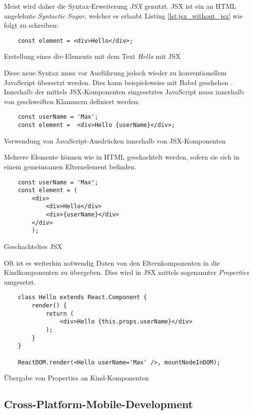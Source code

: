 Meist wird daher die Syntax-Erweiterung \textit{JSX} genutzt. JSX ist ein an HTML angelehnte \textit{Syntactic Sugar}, welcher es erlaubt Listing \ref{lst:jsx_without_jsx} wie folgt zu schreiben:
\begin{listing}[H]
    \begin{verbatim}
    const element = <div>Hello</div>;
    \end{verbatim}
    \caption{Erstellung eines div-Elements mit dem Text \textit{Hello} mit JSX}
    \label{lst:jsx_with_jsx}
\end{listing}
Diese neue Syntax muss vor Ausführung jedoch wieder zu konventionellem JavaScript übersetzt werden. Dies kann beispielsweise mit Babel geschehen \cite{facebook_inc._introducing_2016}.
Innerhalb der mittels JSX-Komponenten eingesetztes JavaScript muss innerhalb von geschweiften Klammern definiert werden: 

\begin{listing}[H]
    \begin{verbatim}
    const userName = 'Max';
    const element =  <div>Hello {userName}</div>;
    \end{verbatim}
    \caption{Verwendung von JavaScript-Ausdrücken innerhalb von JSX-Komponenten}
    \label{lst:embedded_expression}
\end{listing}

Mehrere Elemente können wie in HTML geschachtelt werden, sofern sie sich in einem gemeinsamen Elternelement befinden.

\begin{listing}[H]
    \begin{verbatim}
    const userName = 'Max';
    const element = (
        <div>
            <div>Hello</div>
            <div>{userName}</div>
        </div>
        );
    \end{verbatim}
    \caption{Geschachteltes JSX}
    \label{lst:jsx_nested}
\end{listing}

Oft ist es weiterhin notwendig Daten von den Elternkomponenten in die Kindkomponenten zu übergeben. Dies wird in JSX mittels sogenannter \textit{Properties} umgesetzt.

\begin{listing}[H]
    \begin{verbatim}
    class Hello extends React.Component {
        render() {
            return (
                <div>Hello {this.props.userName}</div>
            );
        }
    }
    
    ReactDOM.render(<Hello userName='Max' />, mountNodeInDOM);
    \end{verbatim}
    \caption{Übergabe von Properties an Kind-Komponenten}
    \label{lst:jsx_nested}
\end{listing}



% 


\subsection{Cross-Platform-Mobile-Development}